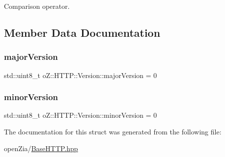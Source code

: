 Comparison operator. 



\subsection{Member Data Documentation}
\mbox{\label{structo_z_1_1_h_t_t_p_1_1_version_a451d759d7fcdcef197c21140b1e9527e}} 
\subsubsection{\texorpdfstring{majorVersion}{majorVersion}}
{\footnotesize\ttfamily std\+::uint8\+\_\+t o\+Z\+::\+H\+T\+T\+P\+::\+Version\+::major\+Version = 0}

\mbox{\label{structo_z_1_1_h_t_t_p_1_1_version_a13e3758802c2b9b974f56d1ea25fafad}} 
\subsubsection{\texorpdfstring{minorVersion}{minorVersion}}
{\footnotesize\ttfamily std\+::uint8\+\_\+t o\+Z\+::\+H\+T\+T\+P\+::\+Version\+::minor\+Version = 0}



The documentation for this struct was generated from the following file\+:\begin{DoxyCompactItemize}
\item 
open\+Zia/\mbox{\hyperlink{_base_h_t_t_p_8hpp}{Base\+H\+T\+T\+P.\+hpp}}\end{DoxyCompactItemize}
